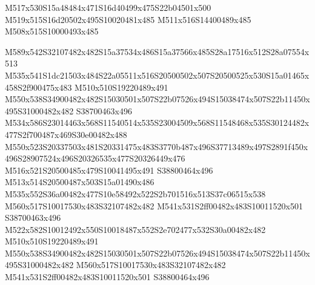 \documentclass{article}
\begin{document}
\begin{multicols}{2}










\begin{center}
M517x530S15a48484x471S16d40499x475S22b04501x500 M519x515S16d20502x495S10020481x485 M511x516S14400489x485 M508x515S10000493x485 
\end{center}


M589x542S32107482x482S15a37534x486S15a37566x485S28a17516x512S28a07554x513 M535x541S1dc21503x484S22a05511x516S20500502x507S20500525x530S15a01465x458S2f900475x483 M510x510S19220489x491 M550x538S34900482x482S15030501x507S22b07526x494S15038474x507S22b11450x495S31000482x482 S38700463x496 M534x586S23014463x568S11540514x535S23004509x568S11548468x535S30124482x477S2f700487x469S30e00482x488 M550x523S20337503x481S20331475x483S3770b487x496S37713489x497S2891f450x496S28907524x496S20326535x477S20326449x476 M516x521S20500485x479S10041495x491 S38800464x496 M513x514S20500487x503S15a01490x486 M535x552S36a00482x477S10e58492x522S2b701516x513S37c06515x538 M560x517S10017530x483S32107482x482 M541x531S2ff00482x483S10011520x501 S38700463x496 M522x582S10012492x550S10018487x552S2e702477x532S30a00482x482 M510x510S19220489x491 M550x538S34900482x482S15030501x507S22b07526x494S15038474x507S22b11450x495S31000482x482 M560x517S10017530x483S32107482x482 M541x531S2ff00482x483S10011520x501 S38800464x496


\end{multicols}
\end{document}
